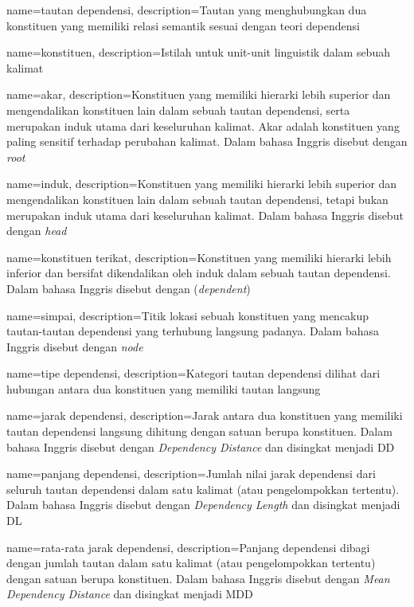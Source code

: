 {
    name=tautan dependensi,
    description={Tautan yang menghubungkan dua konstituen yang memiliki relasi semantik sesuai dengan teori dependensi}
}

{
    name=konstituen,
    description={Istilah untuk unit-unit linguistik dalam sebuah kalimat}
}

{
    name=akar,
    description={Konstituen yang memiliki hierarki lebih superior dan mengendalikan konstituen lain dalam sebuah tautan dependensi, serta merupakan induk utama dari keseluruhan kalimat. Akar adalah konstituen yang paling sensitif terhadap perubahan kalimat. Dalam bahasa Inggris disebut dengan \textit{root}}
}

{
    name=induk,
    description={Konstituen yang memiliki hierarki lebih superior dan mengendalikan konstituen lain dalam sebuah tautan dependensi, tetapi bukan merupakan induk utama dari keseluruhan kalimat. Dalam bahasa Inggris disebut dengan \textit{head}}
}

{
    name=konstituen terikat,
    description={Konstituen yang memiliki hierarki lebih inferior dan bersifat dikendalikan oleh induk dalam sebuah tautan dependensi. Dalam bahasa Inggris disebut dengan (\textit{dependent})}
}

{
    name=simpai,
    description={Titik lokasi sebuah konstituen yang mencakup tautan-tautan dependensi yang terhubung langsung padanya. Dalam bahasa Inggris disebut dengan \textit{node}}
}

{
    name=tipe dependensi,
    description={Kategori tautan dependensi dilihat dari hubungan antara dua konstituen yang memiliki tautan langsung}
}

{
    name=jarak dependensi,
    description={Jarak antara dua konstituen yang memiliki tautan dependensi langsung dihitung dengan satuan berupa konstituen. Dalam bahasa Inggris disebut dengan \textit{Dependency Distance} dan disingkat menjadi DD}
}

{
    name=panjang dependensi,
    description={Jumlah nilai jarak dependensi dari seluruh tautan dependensi dalam satu kalimat (atau pengelompokkan tertentu). Dalam bahasa Inggris disebut dengan \textit{Dependency Length} dan disingkat menjadi DL}
}

{
    name=rata-rata jarak dependensi,
    description={Panjang dependensi dibagi dengan jumlah tautan dalam satu kalimat (atau pengelompokkan tertentu) dengan satuan berupa konstituen. Dalam bahasa Inggris disebut dengan \textit{Mean Dependency Distance} dan disingkat menjadi MDD}
}

